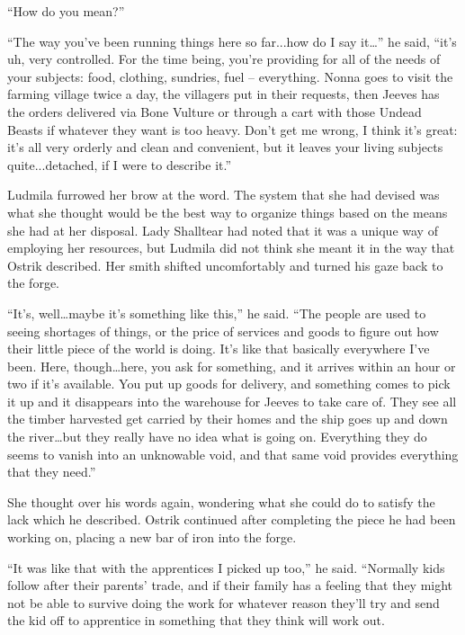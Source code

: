  

“How do you mean?”

 

“The way you’ve been running things here so far...how do I say it…” he said, “it’s uh, very controlled. For the time being, you’re providing for all of the needs of your subjects: food, clothing, sundries, fuel – everything. Nonna goes to visit the farming village twice a day, the villagers put in their requests, then Jeeves has the orders delivered via Bone Vulture or through a cart with those Undead Beasts if whatever they want is too heavy. Don’t get me wrong, I think it’s great: it’s all very orderly and clean and convenient, but it leaves your living subjects quite...detached, if I were to describe it.”

 

Ludmila furrowed her brow at the word. The system that she had devised was what she thought would be the best way to organize things based on the means she had at her disposal. Lady Shalltear had noted that it was a unique way of employing her resources, but Ludmila did not think she meant it in the way that Ostrik described. Her smith shifted uncomfortably and turned his gaze back to the forge.

 

“It’s, well…maybe it’s something like this,” he said. “The people are used to seeing shortages of things, or the price of services and goods to figure out how their little piece of the world is doing. It’s like that basically everywhere I’ve been. Here, though…here, you ask for something, and it arrives within an hour or two if it’s available. You put up goods for delivery, and something comes to pick it up and it disappears into the warehouse for Jeeves to take care of. They see all the timber harvested get carried by their homes and the ship goes up and down the river…but they really have no idea what is going on. Everything they do seems to vanish into an unknowable void, and that same void provides everything that they need.”

 

She thought over his words again, wondering what she could do to satisfy the lack which he described. Ostrik continued after completing the piece he had been working on, placing a new bar of iron into the forge.

 

“It was like that with the apprentices I picked up too,” he said. “Normally kids follow after their parents’ trade, and if their family has a feeling that they might not be able to survive doing the work for whatever reason they’ll try and send the kid off to apprentice in something that they think will work out.

